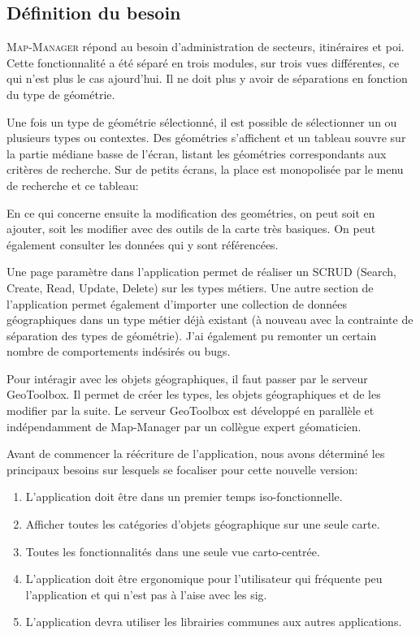 \documentclass{rapportUHA40}
\begin{document}

\subsection{Définition du besoin}
\textsc{Map-Manager} répond au besoin d'administration de secteurs,
itinéraires et poi. Cette fonctionnalité a été séparé en trois modules, sur
trois vues différentes, ce qui n'est plus le cas ajourd'hui. Il ne doit plus y
avoir de séparations en fonction du type de géométrie.

Une fois un type de géométrie sélectionné, il est possible de sélectionner un
ou plusieurs types ou contextes. Des géométries s'affichent et un tableau
souvre sur la partie médiane basse de l'écran, listant les géométries
correspondants aux critères de recherche. Sur de petits écrans, la place est
monopolisée par le menu de recherche et ce tableau:

En ce qui concerne ensuite la modification des geométries, on peut soit en
ajouter, soit les modifier avec des outils de la carte très basiques. On peut
également consulter les données qui y sont référencées.

Une page paramètre dans l'application permet de réaliser un SCRUD (Search,
Create, Read, Update, Delete) sur les types métiers. Une autre section de
l'application permet également d'importer une collection de données
géographiques dans un type métier déjà existant (à nouveau avec la contrainte
de séparation des types de géométrie). J'ai également pu remonter un certain
nombre de comportements indésirés ou bugs.

Pour intéragir avec les objets géographiques, il faut passer par le serveur
GeoToolbox. Il permet de créer les types, les objets géographiques et de les
modifier par la suite. Le serveur GeoToolbox est développé en parallèle et
indépendamment de Map-Manager par un collègue expert géomaticien.

Avant de commencer la réécriture de l'application, nous avons déterminé les
principaux besoins sur lesquels se focaliser pour cette nouvelle version:
\begin{enumerate}
  \item L'application doit être dans un premier temps iso-fonctionnelle.
  \item Afficher toutes les catégories d'objets géographique sur une seule carte.
  \item Toutes les fonctionnalités dans une seule vue carto-centrée.
  \item L'application doit être ergonomique pour l'utilisateur qui fréquente peu
        l'application et qui n'est pas à l'aise avec les \gls{sig}.
  \item L'application devra utiliser les librairies communes aux autres applications.
\end{enumerate}
\end{document}
